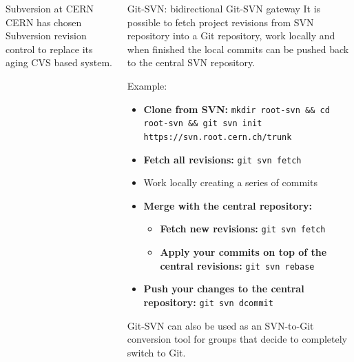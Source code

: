 \documentclass[final,hyperref={pdfpagelabels=false},notitlepage=true]{beamer}
\begin{document}
\begin{frame}{}
\begin{columns}[t]
\begin{column}{0.45\linewidth}
    \begin{block}{\large Subversion at CERN}
      CERN has chosen Subversion revision control to replace its aging CVS based system.
    \end{block}

    \end{column}
      \begin{column}{0.45\linewidth}

	\begin{block}{\large Git-SVN: bidirectional Git-SVN gateway}
	  It is possible to fetch project revisions from SVN repository into a Git 
          repository, work locally and when finished the local commits
          can be pushed back to the central SVN repository.

          Example:
          \begin{itemize}
            \item {\bf Clone from SVN:} {\tt mkdir root-svn \&\& cd root-svn \&\& git svn init https://svn.root.cern.ch/trunk}
            \item {\bf Fetch all revisions:} {\tt git svn fetch}
            \item Work locally creating a series of commits
            \item {\bf Merge with the central repository:}
              \begin{itemize}
                \item {\bf Fetch new revisions:} {\tt git svn fetch}
                \item {\bf Apply your commits on top of the central revisions:} {\tt git svn rebase}
              \end{itemize}
            \item {\bf Push your changes to the central repository:} {\tt git svn dcommit}
          \end{itemize}

          Git-SVN can also be used as an SVN-to-Git conversion tool
          for groups that decide to completely switch to Git.
	\end{block}


\end{column}
\end{columns}
\end{frame}
\end{document}

